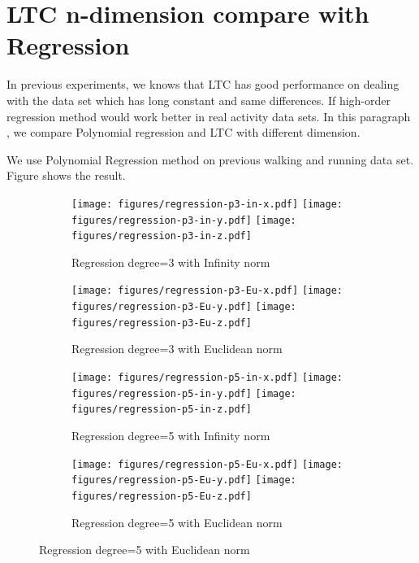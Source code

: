 \documentclass{report}
\begin{document}
\section{LTC n-dimension compare with Regression}
In previous experiments, we knows that LTC has good performance on dealing with the data set which has long constant and same differences. If high-order regression method would work better in real activity data sets. In this paragraph
, we compare Polynomial regression and LTC with different dimension. 


We use Polynomial Regression method on previous walking and running data set. Figure  shows the result.

\begin{figure}
\centering
\begin{subfigure}{1.4\columnwidth}
\centering
\texttt{[image: figures/regression-p3-in-x.pdf]}
\texttt{[image: figures/regression-p3-in-y.pdf]}
\texttt{[image: figures/regression-p3-in-z.pdf]}
\caption{Regression degree=3 with Infinity norm}
\end{subfigure}
{\footnotesize}

\centering
\begin{subfigure}{1.4\columnwidth}
\centering
\texttt{[image: figures/regression-p3-Eu-x.pdf]}
\texttt{[image: figures/regression-p3-Eu-y.pdf]}
\texttt{[image: figures/regression-p3-Eu-z.pdf]}
\caption{Regression degree=3 with Euclidean norm}
\end{subfigure}

\centering
\begin{subfigure}{1.4\columnwidth}
\centering
\texttt{[image: figures/regression-p5-in-x.pdf]}
\texttt{[image: figures/regression-p5-in-y.pdf]}
\texttt{[image: figures/regression-p5-in-z.pdf]}
\caption{Regression degree=5 with Infinity norm}
\end{subfigure}
{\footnotesize}

\centering
\begin{subfigure}{1.4\columnwidth}
\centering
\texttt{[image: figures/regression-p5-Eu-x.pdf]}
\texttt{[image: figures/regression-p5-Eu-y.pdf]}
\texttt{[image: figures/regression-p5-Eu-z.pdf]}
\caption{Regression degree=5 with Euclidean norm}
\end{subfigure}

\end{figure}
\end{document}
